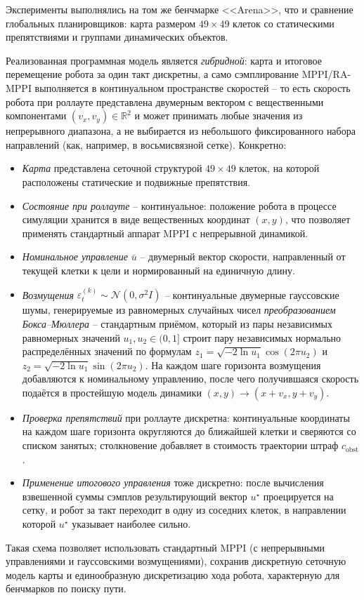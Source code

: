 \documentclass[a4paper,12pt]{extarticle}
\begin{document}
    Эксперименты выполнялись на том же бенчмарке <<Arena>>, что и сравнение глобальных планировщиков: карта размером $49 \times 49$ клеток со статическими препятствиями и группами динамических объектов.

    Реализованная программная модель является \emph{гибридной}: карта и итоговое перемещение робота за один такт дискретны, а само сэмплирование MPPI/RA-MPPI выполняется в континуальном пространстве скоростей -- то есть скорость робота при роллауте представлена двумерным вектором с вещественными компонентами $(v_x, v_y) \in \mathbb{R}^2$ и может принимать любые значения из непрерывного диапазона, а не выбирается из небольшого фиксированного набора направлений (как, например, в восьмисвязной сетке). Конкретно:
    \begin{itemize}
        \item \emph{Карта} представлена сеточной структурой $49 \times 49$ клеток, на которой расположены статические и подвижные препятствия.
        \item \emph{Состояние при роллауте} -- континуальное: положение робота в процессе симуляции хранится в виде вещественных координат $(x, y)$, что позволяет применять стандартный аппарат MPPI с непрерывной динамикой.
        \item \emph{Номинальное управление} $\bar{u}$ -- двумерный вектор скорости, направленный от текущей клетки к цели и нормированный на единичную длину.
        \item \emph{Возмущения} $\varepsilon_t^{(k)} \sim \mathcal{N}(0, \sigma^2 I)$ -- континуальные двумерные гауссовские шумы, генерируемые из равномерных случайных чисел \emph{преобразованием Бокса--Мюллера} -- стандартным приёмом, который из пары независимых равномерных значений $u_1, u_2 \in (0, 1]$ строит пару независимых нормально распределённых значений по формулам $z_1 = \sqrt{-2\ln u_1}\cos(2\pi u_2)$ и $z_2 = \sqrt{-2\ln u_1}\sin(2\pi u_2)$. На каждом шаге горизонта возмущения добавляются к номинальному управлению, после чего получившаяся скорость подаётся в простейшую модель динамики $(x, y) \to (x + v_x, y + v_y)$.
        \item \emph{Проверка препятствий} при роллауте дискретна: континуальные координаты на каждом шаге горизонта округляются до ближайшей клетки и сверяются со списком занятых; столкновение добавляет в стоимость траектории штраф $c_\text{obst}$.
        \item \emph{Применение итогового управления} тоже дискретно: после вычисления взвешенной суммы сэмплов результирующий вектор $u^\star$ проецируется на сетку, и робот за такт переходит в одну из соседних клеток, в направлении которой $u^\star$ указывает наиболее сильно.
    \end{itemize}
    Такая схема позволяет использовать стандартный MPPI (с непрерывными управлениями и гауссовскими возмущениями), сохранив дискретную сеточную модель карты и единообразную дискретизацию хода робота, характерную для бенчмарков по поиску пути.
\end{document}
